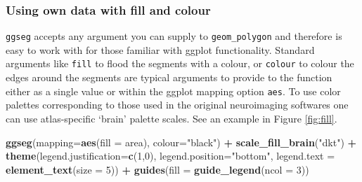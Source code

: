 \documentclass[fleqn,10pt]{wlpeerj} %
\newenvironment{Shaded}{\begin{snugshade}}{\end{snugshade}}
\newcommand{\DataTypeTok}[1]{\textcolor[rgb]{0.13,0.29,0.53}{#1}}
\newcommand{\DecValTok}[1]{\textcolor[rgb]{0.00,0.00,0.81}{#1}}
\newcommand{\KeywordTok}[1]{\textcolor[rgb]{0.13,0.29,0.53}{\textbf{#1}}}
\newcommand{\NormalTok}[1]{#1}
\newcommand{\OperatorTok}[1]{\textcolor[rgb]{0.81,0.36,0.00}{\textbf{#1}}}
\newcommand{\StringTok}[1]{\textcolor[rgb]{0.31,0.60,0.02}{#1}}
\begin{document}
\hypertarget{using-own-data-with-fill-and-colour}{%
\subsubsection{Using own data with fill and colour}\label{using-own-data-with-fill-and-colour}}

\texttt{ggseg} accepts any argument you can supply to \texttt{geom\_polygon} and therefore is easy to work with for those familiar with ggplot functionality.
Standard arguments like \texttt{fill} to flood the segments with a colour, or \texttt{colour} to colour the edges around the segments are typical arguments to provide to the function either as a single value or within the ggplot mapping option \texttt{aes}.
To use color palettes corresponding to those used in the original neuroimaging softwares one can use atlas-specific `brain' palette scales.
See an example in Figure \ref{fig:fill}.

\begin{Shaded}
\begin{Highlighting}[]
\KeywordTok{ggseg}\NormalTok{(}\DataTypeTok{mapping=}\KeywordTok{aes}\NormalTok{(}\DataTypeTok{fill =}\NormalTok{ area), }\DataTypeTok{colour=}\StringTok{"black"}\NormalTok{) }\OperatorTok{+}
\StringTok{  }\KeywordTok{scale_fill_brain}\NormalTok{(}\StringTok{"dkt"}\NormalTok{) }\OperatorTok{+}
\StringTok{  }\KeywordTok{theme}\NormalTok{(}\DataTypeTok{legend.justification=}\KeywordTok{c}\NormalTok{(}\DecValTok{1}\NormalTok{,}\DecValTok{0}\NormalTok{),}
        \DataTypeTok{legend.position=}\StringTok{"bottom"}\NormalTok{,}
        \DataTypeTok{legend.text =} \KeywordTok{element_text}\NormalTok{(}\DataTypeTok{size =} \DecValTok{5}\NormalTok{)) }\OperatorTok{+}
\StringTok{  }\KeywordTok{guides}\NormalTok{(}\DataTypeTok{fill =} \KeywordTok{guide_legend}\NormalTok{(}\DataTypeTok{ncol =} \DecValTok{3}\NormalTok{))}
\end{Highlighting}
\end{Shaded}
\end{document}
